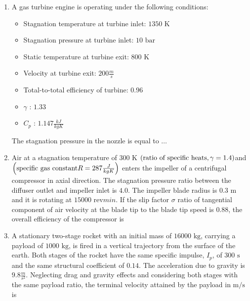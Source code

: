 \documentclass[journal,12pt,twocolumn]{IEEEtran}
\theoremstyle{remark}
\begin{document}
\begin{enumerate}[start=40]
    \item A gas turbine engine is operating under the following conditions:
    \begin{itemize}
        \item Stagnation temperature at turbine inlet: $1350 \text{ K}$
        \item Stagnation pressure at turbine inlet: $10 \text{ bar}$
        \item Static temperature at turbine exit: $800 \text{ K}$
        \item Velocity at turbine exit: $200  \frac{m}{s}$
        \item Total-to-total efficiency of turbine: $0.96$
        \item $\gamma$ : $1.33$
        \item $C_p$ : $1.147 \frac{ kJ}{kg K}$
    \end{itemize}
    
    The stagnation pressure  in the nozzle  is equal to $\dots$

    \item Air at a stagnation temperature of $300 \text{ K}$ $\left(\text{ratio of specific heats}, \gamma = 1.4 \right)$and $\left(\text{specific gas constant} R = 287 \frac {J}{kg K}\right)$ enters the impeller of a centrifugal compressor in axial direction. The stagnation pressure ratio between the diffuser outlet and impeller inlet is $4.0$. The impeller blade radius is $0.3 \text{ m}$ and it is rotating at $15000 \text{ rev}{min}$. If the slip factor $\sigma$ ratio of tangential component of air velocity   at the blade tip to the blade tip speed is $0.88$, the overall efficiency  of the compressor  is

    \item A stationary two-stage rocket with an initial mass of $16000 \text{ kg}$, carrying a payload of $1000 \text{ kg}$, is fired in a vertical trajectory from the surface of the earth. Both stages of the rocket have the same specific impulse, $I_p$, of $300 \text{ s}$ and the same structural coefficient of $0.14$. The acceleration due to gravity is $9.8\frac{ m}{s^2}$. Neglecting drag and gravity effects and considering both stages with the same payload ratio, the terminal velocity attained by the payload in $\text{m/s}$ is


\end{enumerate}
\end{document}
